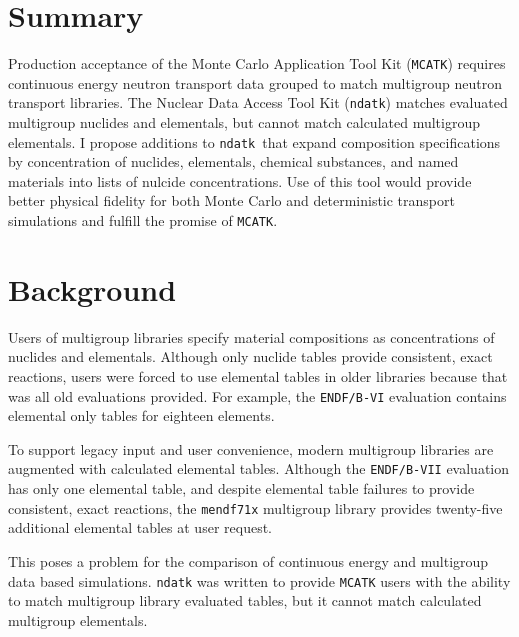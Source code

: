 \documentclass[12pt]{lamemo}
\date{November 19, 2015}
\newcommand{\ndatk}{\texttt{ndatk}}
\newcommand{\MCATK}{\texttt{MCATK}}
\begin{document}
\lstset{language=C++}

\maketitle			%

\section{Summary}

Production acceptance of the Monte Carlo Application Tool Kit (\MCATK)
requires continuous energy neutron transport data grouped to match
multigroup neutron transport libraries.  The Nuclear Data Access Tool
Kit (\ndatk) matches evaluated multigroup nuclides and elementals, but
cannot match calculated multigroup elementals.  I propose additions to
\ndatk\ that expand composition specifications by concentration of
nuclides, elementals, chemical substances, and named materials into
lists of nulcide concentrations.  Use of this tool would provide
better physical fidelity for both Monte Carlo and deterministic
transport simulations and fulfill the promise of \MCATK.

\section{Background}

Users of multigroup libraries specify material compositions as
concentrations of nuclides and elementals.  Although only nuclide
tables provide consistent, exact reactions, users were forced to use
elemental tables in older libraries because that was all old evaluations
provided.  For example, the \texttt{ENDF/B-VI} evaluation contains
elemental only tables for eighteen elements.

To support legacy input and user convenience, modern multigroup
libraries are augmented with calculated elemental tables.  Although
the \texttt{ENDF/B-VII} evaluation has only one elemental table, and
despite elemental table failures to provide consistent, exact
reactions, the \texttt{mendf71x} multigroup library provides
twenty-five additional elemental tables\cite{lee14} at user request.

This poses a problem for the comparison of continuous energy and
multigroup data based simulations.  \ndatk\cite{gray14} was written to
provide \MCATK\cite{adams14} users with the ability to match
multigroup library evaluated tables, but it cannot match calculated
multigroup elementals.
\end{document}

